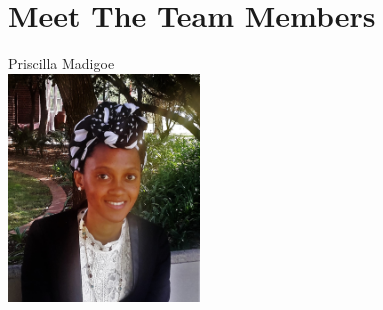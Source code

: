 \documentclass[a4paper,12pt]{article}
\begin{document}
\newpage
\section{Meet The Team Members}


\begin{center}
{\Large Priscilla {Madigoe}} \\[0.3cm]
\includegraphics[width= 2in]{P.jpg}\\[0.4cm] 
\end{center}
\end{document}
